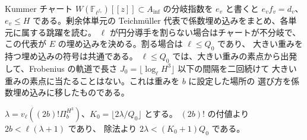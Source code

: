Kummer チャート \(W(\mathbb F_{\ell^{f_v}})[[z]]\subset A_{\inf}\) の分岐指数を
\(e_v\) と書くと \(e_v f_v=d_v\)、\(e_v\le H\) である。剰余体単元の
Teichmüller 代表で係数埋め込みをまとめ、各単元に属する跳躍を読む。
\(\ell\) が円分導手を割らない場合はチャートが不分岐で、この代表が
\(E\) の埋め込みを決める。割る場合は \(\ell\le Q_0\) であり、
大きい重みを持つ埋め込みの符号は共通である。
\(\ell\le Q_0\) では、大きい重みの素点から出発して、Frobenius の軌道で長さ
\(J_0=\lfloor\log_\ell H^3\rfloor\) 以下の間隔を二回続けて
大きい重みの素点に当たることはない。これは重みを \(b\) に設定した場所の
選び方を係数埋め込みに移したものである。

\(\lambda=v_\ell((2b)!\Pi_b^{H^3})\)、\(K_0=\lfloor2\lambda/Q_0\rfloor\) とする。
\((2b)!\) の付値より \(2b<\ell(\lambda+1)\) であり、
除法より \(2\lambda<(K_0+1)Q_0\) である。

